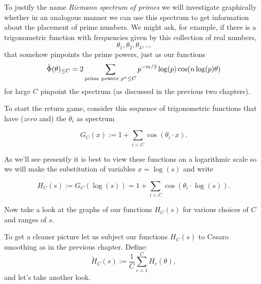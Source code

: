 \documentclass[openany]{book}
\theoremstyle{plain}
\theoremstyle{definition}
\begin{document}
To justify the name {\it Riemann spectrum of primes} we will
investigate graphically whether in an analogous manner we can use this
spectrum to get information about the placement of prime numbers. We
might ask, for example, if there is a trigonometric function with
frequencies given by this collection of real
numbers, $$\theta_1,\theta_2,\theta_3,\dots$$ that somehow pinpoints
the prime powers, just as our functions $${\hat \Phi}(\theta)_{\le C}=
2\sum_{{\rm prime\ powers\ } p^n \le C}
p^{-m/2}\log(p)\cos(n\log(p)\theta)$$ for large $C$ pinpoint the
spectrum (as discussed in the previous two chapters).

  To start the return game, consider this sequence of trigonometric functions that have ($zero$ and)  the $\theta_i$ as  spectrum

   $$G_C(x):= 1+ \sum_{i < C}\cos(\theta_i\cdot x).$$

    As we'll see  presently it is best to view these functions on a logarithmic scale so we will make the substitution of variables  $x = \log(s)$ and write

    $$H_C(s):= G_C(\log(s))= 1+ \sum_{i < C}\cos(\theta_i\cdot \log(s)).$$

    Now take a look at the graphs of our functions $H_C(s)$ for various choices of $C$ and ranges of $s$.


   To get a cleaner picture let us subject our functions $H_C(s)$ to Cesaro smoothing as in the previous chapter. Define:
   $${\tilde H}_C(s) :=  {\frac{1}{C}}\sum_{c=1}^{C} H_c(\theta),$$ and let's take another look.
\end{document}
